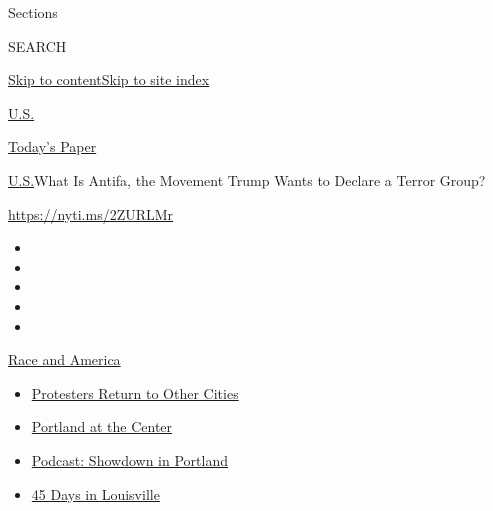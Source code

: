 Sections

SEARCH

\protect\hyperlink{site-content}{Skip to
content}\protect\hyperlink{site-index}{Skip to site index}

\href{https://www.nytimes3xbfgragh.onion/section/us}{U.S.}

\href{https://myaccount.nytimes3xbfgragh.onion/auth/login?response_type=cookie\&client_id=vi}{}

\href{https://www.nytimes3xbfgragh.onion/section/todayspaper}{Today's
Paper}

\href{/section/us}{U.S.}\textbar{}What Is Antifa, the Movement Trump
Wants to Declare a Terror Group?

\url{https://nyti.ms/2ZURLMr}

\begin{itemize}
\item
\item
\item
\item
\item
\end{itemize}

\href{https://www.nytimes3xbfgragh.onion/news-event/george-floyd-protests-minneapolis-new-york-los-angeles?action=click\&pgtype=Article\&state=default\&region=TOP_BANNER\&context=storylines_menu}{Race
and America}

\begin{itemize}
\tightlist
\item
  \href{https://www.nytimes3xbfgragh.onion/2020/07/26/us/protests-portland-seattle-trump.html?action=click\&pgtype=Article\&state=default\&region=TOP_BANNER\&context=storylines_menu}{Protesters
  Return to Other Cities}
\item
  \href{https://www.nytimes3xbfgragh.onion/2020/07/24/us/portland-oregon-protests-white-race.html?action=click\&pgtype=Article\&state=default\&region=TOP_BANNER\&context=storylines_menu}{Portland
  at the Center}
\item
  \href{https://www.nytimes3xbfgragh.onion/2020/07/23/podcasts/the-daily/portland-protests.html?action=click\&pgtype=Article\&state=default\&region=TOP_BANNER\&context=storylines_menu}{Podcast:
  Showdown in Portland}
\item
  \href{https://www.nytimes3xbfgragh.onion/interactive/2020/07/16/us/black-lives-matter-protests-louisville-breonna-taylor.html?action=click\&pgtype=Article\&state=default\&region=TOP_BANNER\&context=storylines_menu}{45
  Days in Louisville}
\end{itemize}

